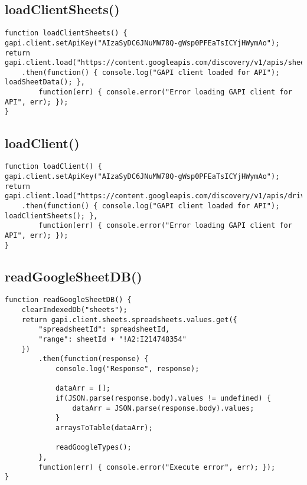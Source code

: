 \documentclass[letterpaper]{article}
\begin{document}
\subsection{loadClientSheets()}

\begin{lstlisting}[firstnumber=90]
function loadClientSheets() {
gapi.client.setApiKey("AIzaSyDC6JNuMW78Q-gWsp0PFEaTsICYjHWymAo");
return gapi.client.load("https://content.googleapis.com/discovery/v1/apis/sheets/v4/rest")
    .then(function() { console.log("GAPI client loaded for API"); loadSheetData(); },
        function(err) { console.error("Error loading GAPI client for API", err); });
}
\end{lstlisting}

\subsection{loadClient()}

\begin{lstlisting}[firstnumber=97]
function loadClient() {
gapi.client.setApiKey("AIzaSyDC6JNuMW78Q-gWsp0PFEaTsICYjHWymAo");
return gapi.client.load("https://content.googleapis.com/discovery/v1/apis/drive/v3/rest")
    .then(function() { console.log("GAPI client loaded for API"); loadClientSheets(); },
        function(err) { console.error("Error loading GAPI client for API", err); });
}
\end{lstlisting}

\subsection{readGoogleSheetDB()}

\begin{lstlisting}[firstnumber=104]
function readGoogleSheetDB() {
    clearIndexedDb("sheets");
    return gapi.client.sheets.spreadsheets.values.get({
        "spreadsheetId": spreadsheetId,
        "range": sheetId + "!A2:I214748354"
    })
        .then(function(response) {
            console.log("Response", response);

            dataArr = [];
            if(JSON.parse(response.body).values != undefined) {
                dataArr = JSON.parse(response.body).values;
            }
            arraysToTable(dataArr);

            readGoogleTypes();
        },
        function(err) { console.error("Execute error", err); });
}
\end{lstlisting}
\end{document}
